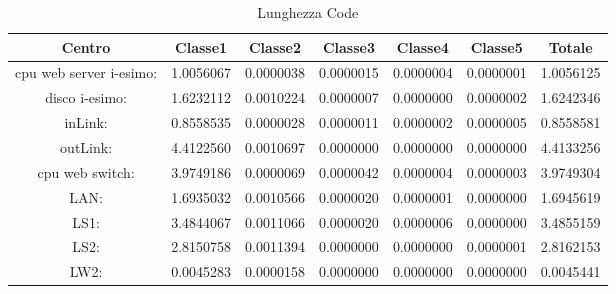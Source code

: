 \begin{table}[H]
\begin{center}\begin{scriptsize}
\begin{tabular}{||c|c|c|c|c|c|c||}
\hline
Centro &Classe1 &Classe2 &Classe3 &Classe4 &Classe5 &Totale\\
\hline
\hline
 cpu web server i-esimo: 	&1.0056067	&0.0000038	&0.0000015	&0.0000004	&0.0000001	&1.0056125\\
\hline
 disco i-esimo: 	&1.6232112	&0.0010224	&0.0000007	&0.0000000	&0.0000002	&1.6242346\\
\hline
 inLink: 	&0.8558535	&0.0000028	&0.0000011	&0.0000002	&0.0000005	&0.8558581\\
\hline
 outLink: 	&4.4122560	&0.0010697	&0.0000000	&0.0000000	&0.0000000	&4.4133256\\
\hline
 cpu web switch: 	&3.9749186	&0.0000069	&0.0000042	&0.0000004	&0.0000003	&3.9749304\\
\hline
 LAN: 	&1.6935032	&0.0010566	&0.0000020	&0.0000001	&0.0000000	&1.6945619\\
\hline
 LS1: 	&3.4844067	&0.0011066	&0.0000020	&0.0000006	&0.0000000	&3.4855159\\
\hline
 LS2: 	&2.8150758	&0.0011394	&0.0000000	&0.0000000	&0.0000001	&2.8162153\\
\hline
 LW2: 	&0.0045283	&0.0000158	&0.0000000	&0.0000000	&0.0000000	&0.0045441\\
\hline
\end{tabular}
\end{scriptsize}\end{center}
\caption{Lunghezza Code}
\label{lunghezzacode}
\end{table}

